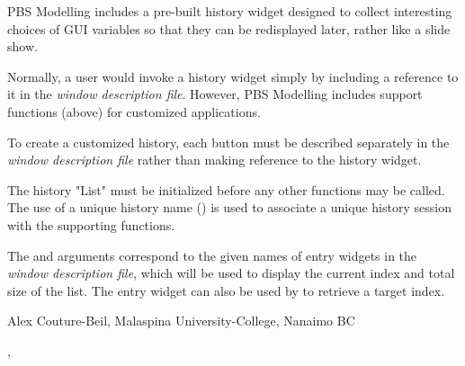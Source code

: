 \documentclass[letterpaper]{book}
\begin{document}
\begin{Details}\relax
PBS Modelling includes a pre-built history widget designed to collect interesting choices of
GUI variables so that they can be redisplayed later, rather like a slide show. 

Normally, a user would invoke a history widget simply by including a reference to it 
in the \emph{window description file}. However, PBS Modelling includes support functions (above) 
for customized applications.

To create a customized history, each button must be described separately in the 
\emph{window description file} rather than making reference to the history widget.

The history "List" must be initialized before any other functions may be called. 
The use of a unique history name () is used to associate a unique 
history session with the supporting functions.

The  and  arguments correspond to the given names 
of entry widgets in the \emph{window description file}, which will be used to display the 
current index and total size of the list. The  entry widget can also 
be used by  to retrieve a target index.
\end{Details}
\begin{Author}\relax
Alex Couture-Beil, Malaspina University-College, Nanaimo BC
\end{Author}
\begin{SeeAlso}\relax
{}, 
\end{SeeAlso}
\end{document}
